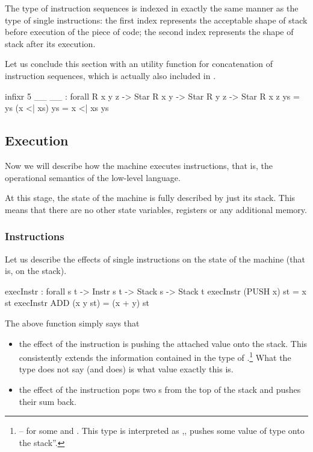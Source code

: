 \noindent The type of instruction sequences is indexed in exactly the same
manner as the type of single instructions: the first index represents the
acceptable shape of stack before execution of the piece of code; the second
index represents the shape of stack after its execution.

Let us conclude this section with an utility function for concatenation of
instruction sequences, which is actually also included in .

\begin{code}
  infixr 5 _\app\_
  _\app\_ : forall {R x y z} -> Star R x y -> Star R y z -> Star R x z
  \nil \app ys = ys
  (x <| xs) \app ys = x <| xs \app ys
\end{code}

\subsection{Execution}

Now we will describe how the machine executes instructions, that is,
the operational semantics of the low-level language.

At this stage, the state of the machine is fully described by just its stack. This
means that there are no other state variables, registers or any additional
memory.

\subsubsection{Instructions}

Let us describe the effects of single instructions on the state of the machine
(that is, on the stack).

\begin{code}
  execInstr : forall {s t} -> Instr s t -> Stack s -> Stack t
  execInstr (PUSH x) st = x \scons st
  execInstr ADD (x \scons y \scons st) = (x + y) \scons st
\end{code}

\noindent The above function simply says that
\begin{itemize}
  \item the effect of the instruction  is pushing the attached
    value onto the stack. This consistently extends the information contained
    in the type of .\footnote{ -- for
    some  and . This type is interpreted as ,,
    pushes some value of type  onto the stack''.}
    What the type does not say (and 
    does) is what value exactly this is.
  \item the effect of the instruction  pops two s from
    the top of the stack and pushes their sum back.
\end{itemize}

